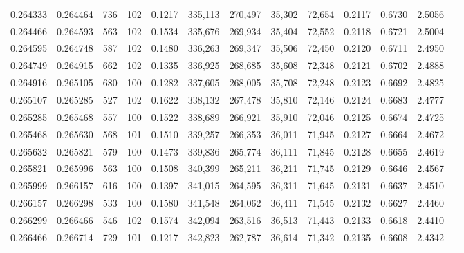 \begin{tabular}{rrrrrrrrrrrrr}
0.264333 & 0.264464 &   736 & 102 &                                     0.1217 & 335,113 & 270,497 &  35,302 &  72,654 & 0.2117 & 0.6730 & 2.5056 \\
0.264466 & 0.264593 &   563 & 102 &                                     0.1534 & 335,676 & 269,934 &  35,404 &  72,552 & 0.2118 & 0.6721 & 2.5004 \\
0.264595 & 0.264748 &   587 & 102 &                                     0.1480 & 336,263 & 269,347 &  35,506 &  72,450 & 0.2120 & 0.6711 & 2.4950 \\
0.264749 & 0.264915 &   662 & 102 &                                     0.1335 & 336,925 & 268,685 &  35,608 &  72,348 & 0.2121 & 0.6702 & 2.4888 \\
0.264916 & 0.265105 &   680 & 100 &                                     0.1282 & 337,605 & 268,005 &  35,708 &  72,248 & 0.2123 & 0.6692 & 2.4825 \\
0.265107 & 0.265285 &   527 & 102 &                                     0.1622 & 338,132 & 267,478 &  35,810 &  72,146 & 0.2124 & 0.6683 & 2.4777 \\
0.265285 & 0.265468 &   557 & 100 &                                     0.1522 & 338,689 & 266,921 &  35,910 &  72,046 & 0.2125 & 0.6674 & 2.4725 \\
0.265468 & 0.265630 &   568 & 101 &                                     0.1510 & 339,257 & 266,353 &  36,011 &  71,945 & 0.2127 & 0.6664 & 2.4672 \\
0.265632 & 0.265821 &   579 & 100 &                                     0.1473 & 339,836 & 265,774 &  36,111 &  71,845 & 0.2128 & 0.6655 & 2.4619 \\
0.265821 & 0.265996 &   563 & 100 &                                     0.1508 & 340,399 & 265,211 &  36,211 &  71,745 & 0.2129 & 0.6646 & 2.4567 \\
0.265999 & 0.266157 &   616 & 100 &                                     0.1397 & 341,015 & 264,595 &  36,311 &  71,645 & 0.2131 & 0.6637 & 2.4510 \\
0.266157 & 0.266298 &   533 & 100 &                                     0.1580 & 341,548 & 264,062 &  36,411 &  71,545 & 0.2132 & 0.6627 & 2.4460 \\
0.266299 & 0.266466 &   546 & 102 &                                     0.1574 & 342,094 & 263,516 &  36,513 &  71,443 & 0.2133 & 0.6618 & 2.4410 \\
0.266466 & 0.266714 &   729 & 101 &                                     0.1217 & 342,823 & 262,787 &  36,614 &  71,342 & 0.2135 & 0.6608 & 2.4342 \\

\end{tabular}
